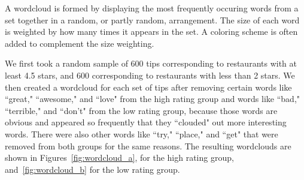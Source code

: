 \documentclass[11pt]{article}
\begin{document}
A wordcloud is formed by displaying the most frequently occuring words from a set together in a random, or partly random, arrangement. The size of each word is weighted by how many times it appears in the set. A coloring scheme is often added to complement the size weighting.

We first took a random sample of 600 tips corresponding to restaurants with at least 4.5 stars, and 600 corresponding to restaurants with less than 2 stars. We then created a wordcloud for each set of tips after removing certain words like ``great," ``awesome," and ``love" from the high rating group and words like ``bad," ``terrible," and ``don't" from the low rating group, because those words are obvious and appeared so frequently that they ``clouded" out more interesting words. There were also other words like ``try," ``place," and ``get" that were removed from both groups for the same reasons. The resulting wordclouds are shown in Figures~\ref{fig:wordcloud_a}, for the high rating group, and~\ref{fig:wordcloud_b} for the low rating group.
\end{document}
